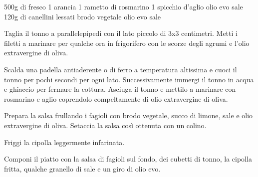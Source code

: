 \begin{ingreds}
	500g di  fresco
	1 arancia
	1 rametto di rosmarino
	1 spicchio d'aglio
	olio evo
	sale
\columnbreak
{}
	120g di  canellini lessati
	brodo vegetale
	olio evo
	sale
\end{ingreds}

\begin{method}

Taglia il tonno a parallelepipedi con il lato piccolo di 3x3 centimetri. Metti i filetti a marinare per qualche ora in frigorifero con le scorze degli agrumi e l'olio extravergine di oliva.

Scalda una padella antiaderente o di ferro a temperatura altissima e cuoci il tonno per pochi secondi per ogni lato. Successivamente immergi il tonno in acqua e ghiaccio per fermare la cottura. Asciuga il tonno e mettilo a marinare con rosmarino e aglio coprendolo compeltamente di olio extravergine di oliva.

Prepara la salsa frullando i fagioli con brodo vegetale, succo di limone, sale e olio extravergine di oliva. Setaccia la salsa così ottenuta con un colino.

Friggi la cipolla leggermente infarinata.

Componi il piatto con la salsa di fagioli sul fondo, dei cubetti di tonno, la cipolla fritta, qualche granello di sale e un giro di olio evo.
\end {method}
